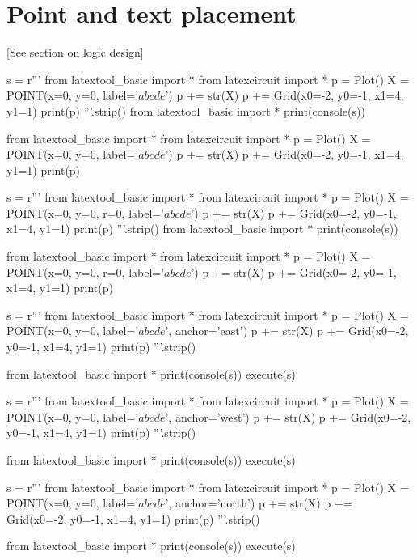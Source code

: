 \section{Point and text placement}

[See section on logic design]

\begin{python}
s = r'''
from latextool_basic import *
from latexcircuit import *
p = Plot()
X = POINT(x=0, y=0, label='$abcde$')
p += str(X)
p += Grid(x0=-2, y0=-1, x1=4, y1=1)
print(p)
'''.strip()
from latextool_basic import *
print(console(s))
\end{python}
\begin{python}
from latextool_basic import *
from latexcircuit import *
p = Plot()
X = POINT(x=0, y=0, label='$abcde$')
p += str(X)
p += Grid(x0=-2, y0=-1, x1=4, y1=1)
print(p)
\end{python}

\newpage
\begin{python}
s = r'''
from latextool_basic import *
from latexcircuit import *
p = Plot()
X = POINT(x=0, y=0, r=0, label='$abcde$')
p += str(X)
p += Grid(x0=-2, y0=-1, x1=4, y1=1)
print(p)
'''.strip()
from latextool_basic import *
print(console(s))
\end{python}
\begin{python}
from latextool_basic import *
from latexcircuit import *
p = Plot()
X = POINT(x=0, y=0, r=0, label='$abcde$')
p += str(X)
p += Grid(x0=-2, y0=-1, x1=4, y1=1)
print(p)
\end{python}




\begin{python}
s = r'''
from latextool_basic import *
from latexcircuit import *
p = Plot()
X = POINT(x=0, y=0, label='$abcde$', anchor='east')
p += str(X)
p += Grid(x0=-2, y0=-1, x1=4, y1=1)
print(p)
'''.strip()

from latextool_basic import *
print(console(s))
execute(s)
\end{python}

\begin{python}
s = r'''
from latextool_basic import *
from latexcircuit import *
p = Plot()
X = POINT(x=0, y=0, label='$abcde$', anchor='west')
p += str(X)
p += Grid(x0=-2, y0=-1, x1=4, y1=1)
print(p)
'''.strip()

from latextool_basic import *
print(console(s))
execute(s)
\end{python}

\begin{python}
s = r'''
from latextool_basic import *
from latexcircuit import *
p = Plot()
X = POINT(x=0, y=0, label='$abcde$', anchor='north')
p += str(X)
p += Grid(x0=-2, y0=-1, x1=4, y1=1)
print(p)
'''.strip()

from latextool_basic import *
print(console(s))
execute(s)
\end{python}


